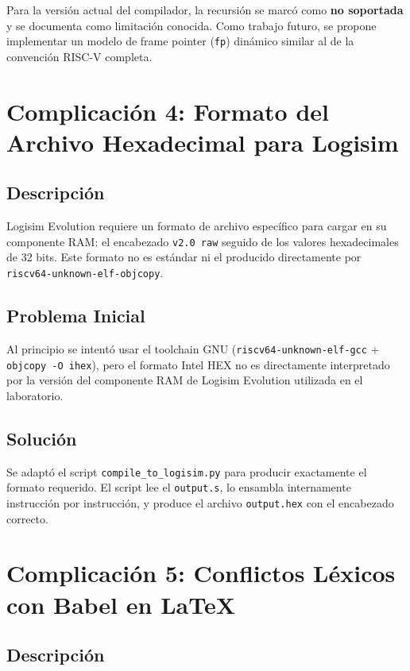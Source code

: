 Para la versión actual del compilador, la recursión se marcó como \textbf{no soportada} y se documenta como limitación conocida. Como trabajo futuro, se propone implementar un modelo de frame pointer (\texttt{fp}) dinámico similar al de la convención RISC-V completa.

\section{Complicación 4: Formato del Archivo Hexadecimal para Logisim}

\subsection{Descripción}

Logisim Evolution requiere un formato de archivo específico para cargar en su componente RAM: el encabezado \texttt{v2.0 raw} seguido de los valores hexadecimales de 32 bits. Este formato no es estándar ni el producido directamente por \texttt{riscv64-unknown-elf-objcopy}.

\subsection{Problema Inicial}

Al principio se intentó usar el toolchain GNU (\texttt{riscv64-unknown-elf-gcc} + \texttt{objcopy -O ihex}), pero el formato Intel HEX no es directamente interpretado por la versión del componente RAM de Logisim Evolution utilizada en el laboratorio.

\subsection{Solución}

Se adaptó el script \texttt{compile\_to\_logisim.py} para producir exactamente el formato requerido. El script lee el \texttt{output.s}, lo ensambla internamente instrucción por instrucción, y produce el archivo \texttt{output.hex} con el encabezado correcto.

\section{Complicación 5: Conflictos Léxicos con Babel en LaTeX}

\subsection{Descripción}

